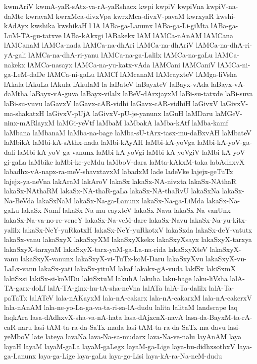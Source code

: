 {kwmAriV
kwmA-yaR-sAtx-va-rA-yaRshacx
kwpi
kwpiV
kwpiVna
kwpiV-na-daMte
kwravaM
kwrxMca-divxVpa
kwrxMca-divxV-pavaM
kwrxyaR
kwshi-kAdAyx
kwshika
kwshikaH
l
lA
lABa-ga-Lanunx
lABa-ga-Li-giMta
lABa-ga-LuM-TA-gu-tatxve
lABa-kAkxgi
lABakekx
lAM
lAMCa-nAnAM
lAMCana
lAMCanaM
lAMCa-nada
lAMCa-na-dhAri
lAMCa-na-dhAriV
lAMCa-na-dhA-ri-yA-gali
lAMCa-na-dhA-ri-yanu
lAMCa-na-ga-Lalilx
lAMCa-na-gaLu
lAMCa-nakekx
lAMCa-nasayx
lAMCa-na-yu-katx-vAda
lAMCani
lAMCaniV
lAMCa-ni-ga-LeM-daDe
lAMCa-ni-gaLu
lAMCf
lAMcanaM
lAMcayxteV
lAMga-liVsha
lAkala
lAkuLa
lAkula
lAkulaM
la
laBateV
laBayxteV
laBayx-vAda
laBayx-vA-daMtha
laBayx-vA-guva
laBayx-vilalx
laBeV-dArxjayxM
laBi-su-tatxde
laBi-suva
laBi-su-vuvu
laGavxV
laGavx-cAR-vidhi
laGavx-cAR-vidhiH
laGivxV
laGivxV-ma-shakatxH
laGivxV-pUjA
laGivxV-pU-je-yanunx
laGuH
laMDaru
laMGeV-ninx-mARlayxM
laMGi-yeVtf
laMbaM
laMbakA
laMba-kAtf
laMba-kamf
laMbana
laMbanaM
laMba-na-bage
laMba-sU-tArx-tasx-mu-daBxvAH
laMbateV
laMbikA
laMbi-kA-sAthx-nada
laMbi-kAyAH
laMbi-kA-yoVga
laMbi-kA-yoV-ga-dali
laMbi-kA-yoV-ga-vanunx
laMbi-kA-yoVgi
laMbi-kA-yoVgiV
laMbi-kA-yoV-gi-gaLa
laMbike
laMbi-ke-yeMdu
laMboV-dara
laMta-kAkxM-taka
labAdhxvX
labadhx-vA-napx-ra-meV-shavxtavxM
labadxM
lade
ladeVke
lajejx-geTuTx
lajejx-ya-neVna
lakAraM
lakAroV
lakaSx
lakaSx-NA-nivxta
lakaSx-NAthaR
lakaSx-NAthaRM
lakaSx-NA-thaR-gaLa
lakaSx-NA-thaRvU
lakaSxNa
lakaSx-Na-BeVda
lakaSxNaM
lakaSx-Na-ga-Lanunx
lakaSx-Na-ga-LiMda
lakaSx-Na-gaLu
lakaSx-Namf
lakaSx-Na-mu-cayxteV
lakaSx-Nava
lakaSx-Na-vanUnx
lakaSx-Na-va-no-re-veneY
lakaSx-Na-veM-dare
lakaSx-Navu
lakaSx-Na-yu-kitx-yalilx
lakaSx-NeY-yuRkatxH
lakaSx-NeY-yuRkotxV
lakaSxda
lakaSx-deY-vatutx
lakaSx-vanu
lakaSxyX
lakaSxyXM
lakaSxyXkekx
lakaSxyXsayx
lakaSxyX-tarxya
lakaSxyX-tarxyaM
lakaSxyX-tarx-yaM-ga-La-na-rida
lakaSxyXteV
lakaSxyX-vanu
lakaSxyX-vanunx
lakaSxyX-vi-TuTx-koM-Daru
lakaSxyXvu
lakaSxyX-vu-LaLx-vanu
lakaSx-yati
lakaSx-yituM
lakaf
lakakx-gA-vuda
lakfSx
lakiSxmX
lakiSxsi
lakiSx-si-koMDu
lakiSxtuM
lakuhA
lakuha
laku-hage
laku-liVsha
lalA-TA-garx-doLf
lalA-TA-ginx-hu-tA-sha-neVna
lalATa
lalA-Ta-dalilx
lalA-Ta-paTaTx
lalATeV
lala-nAKayxM
lala-nA-cakarx
lala-nA-cakarxM
lala-nA-cakerxV
lala-nAnAM
lala-ne-yo-La-ga-va-ta-ri-sa-lA-dudu
lalita
lalitaM
landscape
laq
laqkAra
lasa-dAdhxvX-sha-va-nA-hata
lasa-dAjxcnX-navA
lasa-da-BayxM-ta-rA-caR-naru
lasi-tAM-ta-ra-da-SaTx-mada
lasi-tAM-ta-ra-da-SaTx-ma-davu
lasi-yeMboV
late
lateya
lavaNa
lava-Na-sa-mudarx
lava-Na-ve-nalu
layAnAM
laya
layaH
layaM
layaM-gaLa
layaM-gaLegx
layaM-ga-Lige
laya-bu-didhxsothxV
laya-ga-Lanunx
laya-ga-Lige
laya-gaLu
laya-go-Lisi
laya-kA-ra-Na-neM-dudu
}
